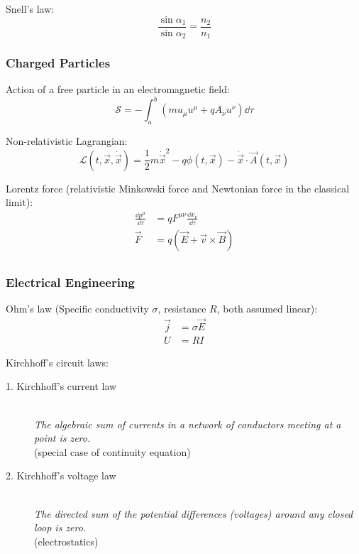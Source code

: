 			\noindent
			Snell's law:
			\begin{equation}
				\frac{\sin\alpha_1}{\sin\alpha_2} = \frac{n_2}{n_1}
			\end{equation}



		\subsubsection{Charged Particles}
			\noindent
			Action of a free particle in an electromagnetic field:
			\begin{equation}
				\mathcal{S}= -\int_{a}^{b}\left(m u_\mu u^\mu + q A_\nu u^\nu\right)\dd{\tau}
			\end{equation}

			\noindent
			Non-relativistic Lagrangian:
			\begin{equation}
				\mathcal{L}(t,\vec{x},\dot{\vec{x}}) = \frac{1}{2}m\dot{\vec{x}}^2 - q\phi(t,\vec{x}) - \dot{\vec{x}}\cdot\vec{A}(t,\vec{x})
			\end{equation}

			\noindent
			Lorentz force (relativistic Minkowski force and Newtonian force in the classical limit):
			\begin{equation}
				\begin{aligned}
					\frac{\dd p^\mu}{\dd \tau} &= q F^{\mu\nu}\frac{\dd x_\nu}{\dd \tau} \\
					\vec{F} &= q\left(\vec{E}+\vec{v}\times\vec{B}\right) \\
				\end{aligned}
			\end{equation}

		\subsubsection{Electrical Engineering}
			\noindent
			Ohm's law (Specific conductivity $\sigma$, resistance $R$, both assumed linear):
			\begin{equation}
				\begin{aligned}
					\vec{j} &= \sigma\vec{E} \\
					U &= R I
				\end{aligned}
			\end{equation}

			\noindent
			Kirchhoff's circuit laws:
			\begin{description}
				\item[1. Kirchhoff's current law] \hfill \\
					{\textit{The algebraic sum of currents in a network of conductors meeting at a point is zero.} \\(special case of continuity equation)}
				\item[2. Kirchhoff's voltage law] \hfill \\
					{\textit{The directed sum of the potential differences (voltages) around any closed loop is zero.} \\(electrostatics)}
			\end{description}

